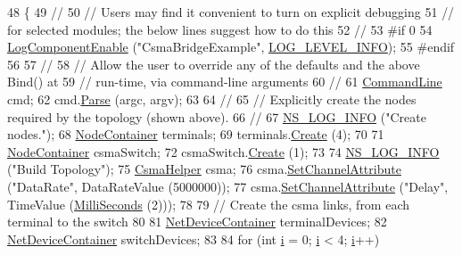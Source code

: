 \begin{DoxyCode}
48 \{
49   \textcolor{comment}{//}
50   \textcolor{comment}{// Users may find it convenient to turn on explicit debugging}
51   \textcolor{comment}{// for selected modules; the below lines suggest how to do this}
52   \textcolor{comment}{//}
53 \textcolor{preprocessor}{#if 0 }
54   \hyperlink{namespacens3_adc4ef4f00bb2f5f4edae67fc3bc27f20}{LogComponentEnable} (\textcolor{stringliteral}{"CsmaBridgeExample"}, \hyperlink{namespacens3_aa6464a4d69551a9cc968e17a65f39bdbae36aedc880de94fd5a5b53bb9fe65628}{LOG\_LEVEL\_INFO});
55 \textcolor{preprocessor}{#endif}
56 
57   \textcolor{comment}{//}
58   \textcolor{comment}{// Allow the user to override any of the defaults and the above Bind() at}
59   \textcolor{comment}{// run-time, via command-line arguments}
60   \textcolor{comment}{//}
61   \hyperlink{classns3_1_1CommandLine}{CommandLine} cmd;
62   cmd.\hyperlink{classns3_1_1CommandLine_a5c10b85b3207e5ecb48d907966923156}{Parse} (argc, argv);
63 
64   \textcolor{comment}{//}
65   \textcolor{comment}{// Explicitly create the nodes required by the topology (shown above).}
66   \textcolor{comment}{//}
67   \hyperlink{group__logging_gafbd73ee2cf9f26b319f49086d8e860fb}{NS\_LOG\_INFO} (\textcolor{stringliteral}{"Create nodes."});
68   \hyperlink{classns3_1_1NodeContainer}{NodeContainer} terminals;
69   terminals.\hyperlink{classns3_1_1NodeContainer_a787f059e2813e8b951cc6914d11dfe69}{Create} (4);
70 
71   \hyperlink{classns3_1_1NodeContainer}{NodeContainer} csmaSwitch;
72   csmaSwitch.\hyperlink{classns3_1_1NodeContainer_a787f059e2813e8b951cc6914d11dfe69}{Create} (1);
73 
74   \hyperlink{group__logging_gafbd73ee2cf9f26b319f49086d8e860fb}{NS\_LOG\_INFO} (\textcolor{stringliteral}{"Build Topology"});
75   \hyperlink{classns3_1_1CsmaHelper}{CsmaHelper} csma;
76   csma.\hyperlink{classns3_1_1CsmaHelper_a886d900b2fe44433e0b81752dea7e7f1}{SetChannelAttribute} (\textcolor{stringliteral}{"DataRate"}, DataRateValue (5000000));
77   csma.\hyperlink{classns3_1_1CsmaHelper_a886d900b2fe44433e0b81752dea7e7f1}{SetChannelAttribute} (\textcolor{stringliteral}{"Delay"}, TimeValue (\hyperlink{group__timecivil_gaf26127cf4571146b83a92ee18679c7a9}{MilliSeconds} (2)));
78 
79   \textcolor{comment}{// Create the csma links, from each terminal to the switch}
80 
81   \hyperlink{classns3_1_1NetDeviceContainer}{NetDeviceContainer} terminalDevices;
82   \hyperlink{classns3_1_1NetDeviceContainer}{NetDeviceContainer} switchDevices;
83 
84   \textcolor{keywordflow}{for} (\textcolor{keywordtype}{int} \hyperlink{bernuolliDistribution_8m_a6f6ccfcf58b31cb6412107d9d5281426}{i} = 0; \hyperlink{bernuolliDistribution_8m_a6f6ccfcf58b31cb6412107d9d5281426}{i} < 4; \hyperlink{bernuolliDistribution_8m_a6f6ccfcf58b31cb6412107d9d5281426}{i}++)

\end{DoxyCode}
